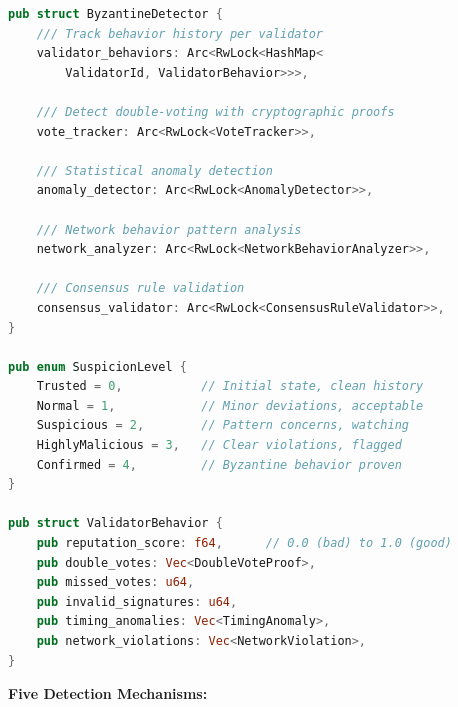 \documentclass[11pt,a4paper]{article}
\begin{document}
\begin{lstlisting}[language=Rust,caption={Multi-Layer Byzantine Detection System}]
pub struct ByzantineDetector {
    /// Track behavior history per validator
    validator_behaviors: Arc<RwLock<HashMap<
        ValidatorId, ValidatorBehavior>>>,

    /// Detect double-voting with cryptographic proofs
    vote_tracker: Arc<RwLock<VoteTracker>>,

    /// Statistical anomaly detection
    anomaly_detector: Arc<RwLock<AnomalyDetector>>,

    /// Network behavior pattern analysis
    network_analyzer: Arc<RwLock<NetworkBehaviorAnalyzer>>,

    /// Consensus rule validation
    consensus_validator: Arc<RwLock<ConsensusRuleValidator>>,
}

pub enum SuspicionLevel {
    Trusted = 0,           // Initial state, clean history
    Normal = 1,            // Minor deviations, acceptable
    Suspicious = 2,        // Pattern concerns, watching
    HighlyMalicious = 3,   // Clear violations, flagged
    Confirmed = 4,         // Byzantine behavior proven
}

pub struct ValidatorBehavior {
    pub reputation_score: f64,      // 0.0 (bad) to 1.0 (good)
    pub double_votes: Vec<DoubleVoteProof>,
    pub missed_votes: u64,
    pub invalid_signatures: u64,
    pub timing_anomalies: Vec<TimingAnomaly>,
    pub network_violations: Vec<NetworkViolation>,
}
\end{lstlisting}

\textbf{Five Detection Mechanisms:}
\end{document}
